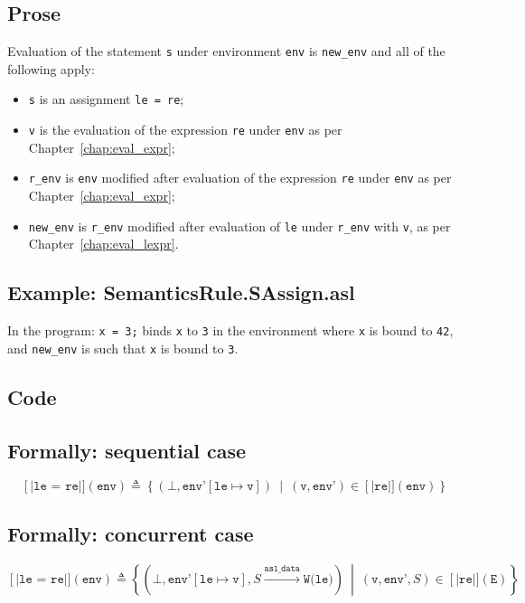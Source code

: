 \documentclass{book}
\newcommand\llbracket{[|}
\newcommand\rrbracket{|]}
\newcommand\interp[1]{\left\llbracket #1 \right\rrbracket}
\newcommand\st[0]{\ \middle|\ }
\newcommand\asldata[0]{\mathtt{asl\_data}}
\begin{document}
  \subsection{Prose}
  Evaluation of the statement \texttt{s} under environment \texttt{env} is
\texttt{new\_env} and all of the following apply:
  \begin{itemize}
  \item \texttt{s} is an assignment \texttt{le = re};
  \item \texttt{v} is the evaluation of the expression \texttt{re} under \texttt{env} as per Chapter~\ref{chap:eval_expr};
  \item \texttt{r\_env} is \texttt{env} modified after evaluation of the expression \texttt{re} under \texttt{env} as per Chapter~\ref{chap:eval_expr};
  \item \texttt{new\_env} is \texttt{r\_env} modified after evaluation of \texttt{le} under \texttt{r\_env} with
    \texttt{v}, as per Chapter~\ref{chap:eval_lexpr}.
  \end{itemize}

  \subsection{Example: SemanticsRule.SAssign.asl}
  In the program:
  \texttt{x = 3;} binds \texttt{x} to \texttt{3} in the environment where \texttt{x} is bound to \texttt{42}, and \texttt{new\_env} is such that \texttt{x} is bound to \texttt{3}.

  \subsection{Code}

  \subsection{Formally: sequential case}
  \begin{equation}
    \interp{\texttt{le = re}} (\texttt{env}) \triangleq
      \left\{ \left(\bot, \texttt{env'}[\texttt{le} \mapsto \texttt{v} ]\right) \st{} (\texttt{v}, \texttt{env'}) \in \interp{\texttt{re}} (\texttt{env}) \right\}
    \label{eq:sem-seq-sassign}
  \end{equation}

  \subsection{Formally: concurrent case}
  \begin{equation}
    \interp{\texttt{le = re}} (\texttt{env}) \triangleq
      \left\{ \left(\bot, \texttt{env'}[\texttt{le} \mapsto \texttt{v} ], S \xrightarrow{\asldata} \texttt{W(le)}\right) \st{}
        (\texttt{v}, \texttt{env'}, S) \in \interp{\texttt{re}} (\texttt{E})
      \right\}
    \label{eq:sem-conc-sassign}
  \end{equation}
\end{document}
